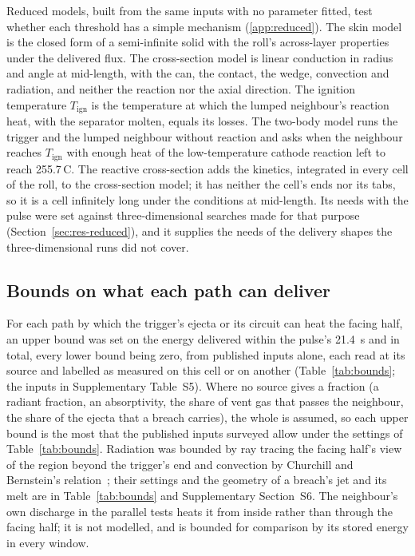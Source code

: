 \documentclass[preprint,12pt]{elsarticle}
\newcommand{\degC}{\,\textdegree C}
\begin{document}
Reduced models, built from the same inputs with no parameter fitted, test whether each threshold has a simple mechanism (\ref{app:reduced}). The skin model is the closed form of a semi-infinite solid with the roll's across-layer properties under the delivered flux. The cross-section model is linear conduction in radius and angle at mid-length, with the can, the contact, the wedge, convection and radiation, and neither the reaction nor the axial direction. The ignition temperature $T_\mathrm{ign}$ is the temperature at which the lumped neighbour's reaction heat, with the separator molten, equals its losses. The two-body model runs the trigger and the lumped neighbour without reaction and asks when the neighbour reaches $T_\mathrm{ign}$ with enough heat of the low-temperature cathode reaction left to reach 255.7\degC. The reactive cross-section adds the kinetics, integrated in every cell of the roll, to the cross-section model; it has neither the cell's ends nor its tabs, so it is a cell infinitely long under the conditions at mid-length. Its needs with the pulse were set against three-dimensional searches made for that purpose (Section~\ref{sec:res-reduced}), and it supplies the needs of the delivery shapes the three-dimensional runs did not cover.

\subsection{Bounds on what each path can deliver}
\label{sec:bounds}

For each path by which the trigger's ejecta or its circuit can heat the facing half, an upper bound was set on the energy delivered within the pulse's 21.4~s and in total, every lower bound being zero, from published inputs alone, each read at its source and labelled as measured on this cell or on another (Table~\ref{tab:bounds}; the inputs in Supplementary Table~S5). Where no source gives a fraction (a radiant fraction, an absorptivity, the share of vent gas that passes the neighbour, the share of the ejecta that a breach carries), the whole is assumed, so each upper bound is the most that the published inputs surveyed allow under the settings of Table~\ref{tab:bounds}. Radiation was bounded by ray tracing the facing half's view of the region beyond the trigger's end and convection by Churchill and Bernstein's relation~\cite{churchill1977correlating}; their settings and the geometry of a breach's jet and its melt are in Table~\ref{tab:bounds} and Supplementary Section~S6. The neighbour's own discharge in the parallel tests heats it from inside rather than through the facing half; it is not modelled, and is bounded for comparison by its stored energy in every window.
\end{document}
